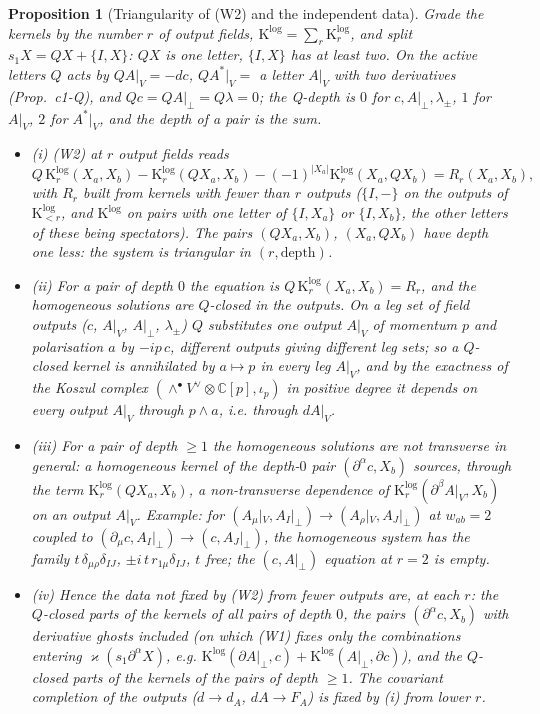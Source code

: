 \documentclass[11pt]{article}
\numberwithin{equation}{section}
\theoremstyle{plain}
\newtheorem{proposition}[theorem]{Proposition}
\theoremstyle{definition}
\begin{document}
\begin{proposition}[Triangularity of (W2) and the independent data]
\label{prop:tl-reduction}
Grade the kernels by the number $r$ of output fields, $\mathrm K^{\log}=\sum_r\mathrm K^{\log}_r$, and split $s_1X=QX+\{I,X\}$: $QX$ is one letter, $\{I,X\}$ has at least two. On the active letters $Q$ acts by $QA|_V=-dc$, $QA^*|_V=$ a letter $A|_V$ with two derivatives (Prop.~c1-Q), and $Qc=QA|_\perp=Q\lambda=0$; the \emph{Q-depth} is $0$ for $c,A|_\perp,\lambda_\pm$, $1$ for $A|_V$, $2$ for $A^*|_V$, and the depth of a pair is the sum.
\begin{itemize}
\item (i) (W2) at $r$ output fields reads
\[
Q\,\mathrm K^{\log}_r(X_a,X_b)-\mathrm K^{\log}_r(QX_a,X_b)-(-1)^{|X_a|}\mathrm K^{\log}_r(X_a,QX_b)=R_r(X_a,X_b),
\]
with $R_r$ built from kernels with fewer than $r$ outputs ($\{I,-\}$ on the outputs of $\mathrm K^{\log}_{<r}$, and $\mathrm K^{\log}$ on pairs with one letter of $\{I,X_a\}$ or $\{I,X_b\}$, the other letters of these being spectators). The pairs $(QX_a,X_b)$, $(X_a,QX_b)$ have depth one less: the system is triangular in $(r,\text{depth})$.
\item (ii) For a pair of depth $0$ the equation is $Q\,\mathrm K^{\log}_r(X_a,X_b)=R_r$, and the homogeneous solutions are $Q$-closed in the outputs. On a leg set of field outputs ($c$, $A|_V$, $A|_\perp$, $\lambda_\pm$) $Q$ substitutes one output $A|_V$ of momentum $p$ and polarisation $a$ by $-ip\,c$, different outputs giving different leg sets; so a $Q$-closed kernel is annihilated by $a\mapsto p$ in every leg $A|_V$, and by the exactness of the Koszul complex $(\wedge^\bullet V^\vee\otimes\mathbb C[p],\iota_p)$ in positive degree it depends on every output $A|_V$ through $p\wedge a$, i.e. through $dA|_V$.
\item (iii) For a pair of depth $\ge1$ the homogeneous solutions are not transverse in general: a homogeneous kernel of the depth-$0$ pair $(\partial^\alpha c,X_b)$ sources, through the term $\mathrm K^{\log}_r(QX_a,X_b)$, a non-transverse dependence of $\mathrm K^{\log}_r(\partial^\beta A|_V,X_b)$ on an output $A|_V$. Example: for $(A_\mu|_V,A_I|_\perp)\to(A_\rho|_V,A_J|_\perp)$ at $w_{ab}=2$ coupled to $(\partial_\mu c,A_I|_\perp)\to(c,A_J|_\perp)$, the homogeneous system has the family $t\,\delta_{\mu\rho}\delta_{IJ}$, $\pm i\,t\,r_{1\mu}\delta_{IJ}$, $t$ free; the $(c,A|_\perp)$ equation at $r=2$ is empty.
\item (iv) Hence the data not fixed by (W2) from fewer outputs are, at each $r$: the $Q$-closed parts of the kernels of all pairs of depth $0$, the pairs $(\partial^\alpha c,X_b)$ with derivative ghosts included (on which (W1) fixes only the combinations entering $\varkappa(s_1\partial^\alpha X)$, e.g. $\mathrm K^{\log}(\partial A|_\perp,c)+\mathrm K^{\log}(A|_\perp,\partial c)$), and the $Q$-closed parts of the kernels of the pairs of depth $\ge1$. The covariant completion of the outputs ($d\to d_A$, $dA\to F_A$) is fixed by (i) from lower $r$.
\end{itemize}
\end{proposition}
\end{document}
